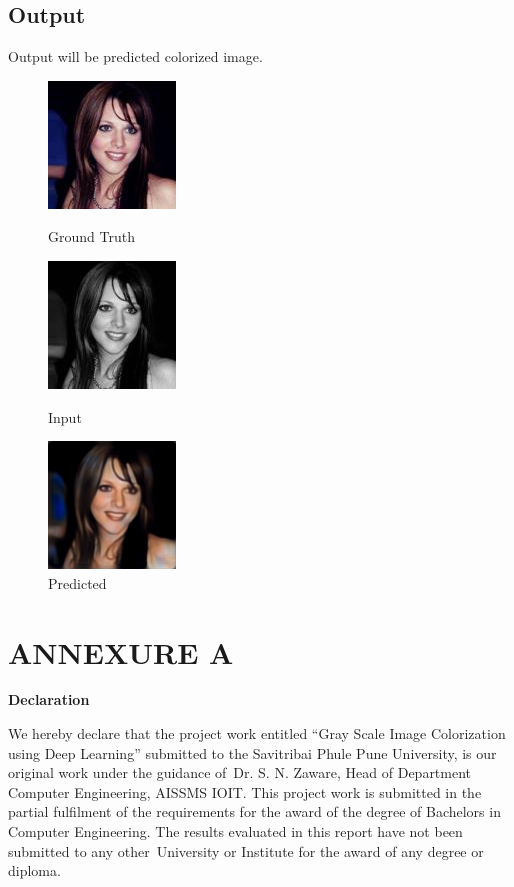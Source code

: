 \documentclass[12pt]{report}	%
\begin{document}
\section{Output}
Output will be predicted colorized image.
\begin{center}

\begin{figure}[htp]

\centering
\includegraphics[width=.3\textwidth]{./GroundTruth.jpg}
\caption{Ground Truth}
\includegraphics[width=.3\textwidth]{./Input.jpg}
\caption{Input}
\includegraphics[width=.3\textwidth]{./Predicted.png}
\caption{Predicted}

\label{fig:figure3}

\end{figure}

\end{center}

\chapter*{ANNEXURE A}
\label{Appendix A}
\begin{center}
    \Large {\bfseries Declaration}
\end{center}
We hereby declare that the project work entitled “Gray Scale Image Colorization using Deep Learning” submitted to the Savitribai Phule Pune University, is our original work under the guidance of Dr. S. N. Zaware, Head of Department Computer Engineering, AISSMS IOIT. This project work is submitted in the partial fulfilment of the requirements for the award of the degree of Bachelors in Computer Engineering. The results evaluated in this report have not been submitted to any other University or Institute for the award of any degree or diploma.
\end{document}
